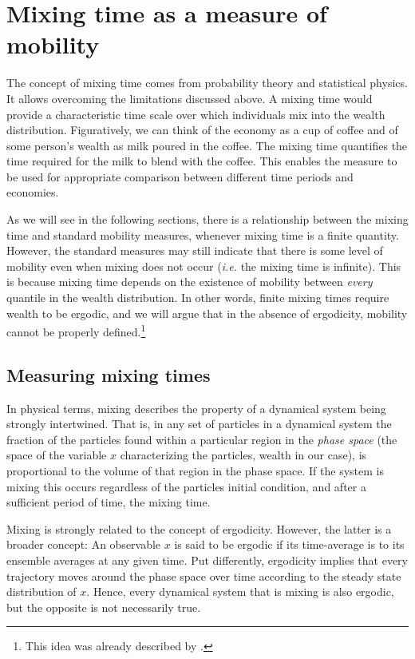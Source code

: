 \documentclass[11pt]{article}
\newcommand{\ie}{{\it i.e.}\xspace}
\numberwithin{equation}{section}
\begin{document}
\FloatBarrier
\section{Mixing time as a measure of mobility}
\label{sec:mixing-time}

The concept of mixing time comes from probability theory and statistical physics. It allows overcoming the limitations discussed above. A mixing time would provide a characteristic time scale over which individuals mix into the wealth distribution. Figuratively, we can think of the economy as a cup of coffee and of some person's wealth as milk poured in the coffee. The mixing time quantifies the time required for the milk to blend with the coffee. This enables the measure to be used for appropriate comparison between different time periods and economies.

As we will see in the following sections, there is a relationship between the mixing time and standard mobility measures, whenever mixing time is a finite quantity. However, the standard measures may still indicate that there is some level of mobility even when mixing does not occur (\ie the mixing time is infinite). This is because mixing time depends on the existence of mobility between \textit{every} quantile in the wealth distribution. In other words, finite mixing times require wealth to be ergodic, and we will argue that in the absence of ergodicity, mobility cannot be properly defined.\footnote{This idea was already described by \citet{Mcfarland1970}.}

\subsection{Measuring mixing times}

In physical terms, mixing describes the property of a dynamical system being strongly intertwined. That is, in any set of particles in a dynamical system the fraction of the particles found within a particular region in the \textit{phase space} (the space of the variable $x$ characterizing the particles, wealth in our case), is proportional to the volume of that region in the phase space. If the system is mixing this occurs regardless of the particles initial condition, and after a sufficient period of time, the mixing time.

Mixing is strongly related to the concept of ergodicity. However, the latter is a broader concept: An observable $x$ is said to be ergodic if its time-average is to its ensemble averages at any given time. Put differently, ergodicity implies that every trajectory moves around the phase space over time according to the steady state distribution of $x$. Hence, every dynamical system that is mixing is also ergodic, but the opposite is not necessarily true.
\end{document}
